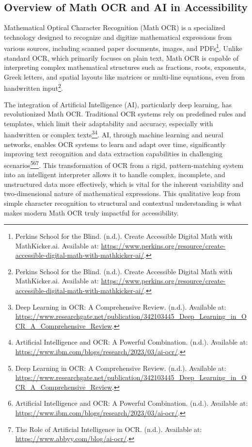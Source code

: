 \subsection{Overview of Math OCR and AI in Accessibility}\label{subsec:math-ocr-ai}
Mathematical Optical Character Recognition (Math OCR) is a specialized technology designed to recognize and digitize mathematical expressions from various sources, including scanned paper documents, images, and PDFs\footnote{Perkins School for the Blind. (n.d.). Create Accessible Digital Math with MathKicker.ai. Available at: \url{https://www.perkins.org/resource/create-accessible-digital-math-with-mathkicker-ai/}.}. Unlike standard OCR, which primarily focuses on plain text, Math OCR is capable of interpreting complex mathematical structures such as fractions, roots, exponents, Greek letters, and spatial layouts like matrices or multi-line equations, even from handwritten input\footnote{Perkins School for the Blind. (n.d.). Create Accessible Digital Math with MathKicker.ai. Available at: \url{https://www.perkins.org/resource/create-accessible-digital-math-with-mathkicker-ai/}.}.

The integration of Artificial Intelligence (AI), particularly deep learning, has revolutionized Math OCR. Traditional OCR systems rely on predefined rules and templates, which limit their adaptability and accuracy, especially with handwritten or complex texts\footnote{Deep Learning in OCR: A Comprehensive Review. (n.d.). Available at: \url{https://www.researchgate.net/publication/342103445_Deep_Learning_in_OCR_A_Comprehensive_Review}.}\footnote{Artificial Intelligence and OCR: A Powerful Combination. (n.d.). Available at: \url{https://www.ibm.com/blogs/research/2023/03/ai-ocr/}.}. AI, through machine learning and neural networks, enables OCR systems to learn and adapt over time, significantly improving text recognition and data extraction capabilities in challenging scenarios\footnote{Deep Learning in OCR: A Comprehensive Review. (n.d.). Available at: \url{https://www.researchgate.net/publication/342103445_Deep_Learning_in_OCR_A_Comprehensive_Review}.}\footnote{Artificial Intelligence and OCR: A Powerful Combination. (n.d.). Available at: \url{https://www.ibm.com/blogs/research/2023/03/ai-ocr/}.}\footnote{The Role of Artificial Intelligence in OCR. (n.d.). Available at: \url{https://www.abbyy.com/blog/ai-ocr/}.}. This transformation of OCR from a rigid, pattern-matching system into an intelligent interpreter allows it to handle complex, incomplete, and unstructured data more effectively, which is vital for the inherent variability and two-dimensional nature of mathematical expressions. This qualitative leap from simple character recognition to structural and contextual understanding is what makes modern Math OCR truly impactful for accessibility.

